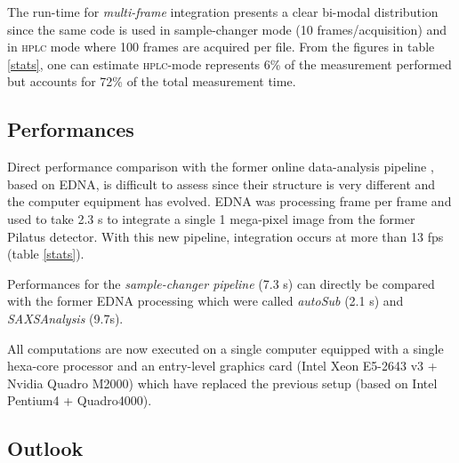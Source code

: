 \documentclass[preprint]{iucr}              %
\begin{document}
The run-time for \textit{multi-frame} integration presents a clear bi-modal distribution since the same code is used in sample-changer mode (10 frames/acquisition) and in \textsc{hplc} mode where 100 frames are acquired per file.
From the figures in table \ref{stats}, one can estimate \textsc{hplc}-mode represents 6\% of the measurement performed but accounts for 72\% of the total measurement time.

\subsection{Performances}
\label{performances}
Direct performance comparison with the former online data-analysis pipeline \cite{BM29ODA}, based on EDNA, is difficult to assess since their structure is very different and the computer equipment has evolved.
EDNA was processing frame per frame and used to take 2.3 s to integrate a single 1 mega-pixel image from the former Pilatus detector.
With this new pipeline, integration occurs at more than 13 fps (table \ref{stats}).

Performances for the \textit{sample-changer pipeline} (7.3 s) can directly be compared with the former EDNA processing which were called \textit{autoSub} (2.1 s) and \textit{SAXSAnalysis} (9.7s).

All computations are now executed on a single computer equipped with a single hexa-core processor and an entry-level graphics card (Intel Xeon E5-2643 v3 + Nvidia Quadro M2000) which have replaced the previous setup (based on Intel Pentium4 + Quadro4000).


\subsection{Outlook}
\end{document}
